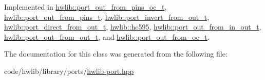 Implemented in \hyperlink{classhwlib_1_1port__out__from__pins__oc__t_ab146f9cb459f7a3b09bd2beae0948210}{hwlib\+::port\+\_\+out\+\_\+from\+\_\+pins\+\_\+oc\+\_\+t}, \hyperlink{classhwlib_1_1port__out__from__pins__t_a8d2a9ecce13e824b305a654675e572e5}{hwlib\+::port\+\_\+out\+\_\+from\+\_\+pins\+\_\+t}, \hyperlink{classhwlib_1_1port__invert__from__out__t_aaa8d6d9bb1d98cd3526d3eb6a91f34d9}{hwlib\+::port\+\_\+invert\+\_\+from\+\_\+out\+\_\+t}, \hyperlink{classhwlib_1_1port__direct__from__out__t_a1548ef3dcb6d110a5b58e3698325ca11}{hwlib\+::port\+\_\+direct\+\_\+from\+\_\+out\+\_\+t}, \hyperlink{classhwlib_1_1hc595_a5cc052f6de8be418a6a3cb69919fd168}{hwlib\+::hc595}, \hyperlink{classhwlib_1_1port__out__from__in__out__t_acc2b58e61226bcf46f7f4c30c94084ee}{hwlib\+::port\+\_\+out\+\_\+from\+\_\+in\+\_\+out\+\_\+t}, \hyperlink{classhwlib_1_1port__out__from__out__t_a42fc682057ea78b827900e95cb3e0d0c}{hwlib\+::port\+\_\+out\+\_\+from\+\_\+out\+\_\+t}, and \hyperlink{classhwlib_1_1port__out__from__oc__t_a33a024caac179b1d82b82d09bfca7645}{hwlib\+::port\+\_\+out\+\_\+from\+\_\+oc\+\_\+t}.



The documentation for this class was generated from the following file\+:\begin{DoxyCompactItemize}
\item 
code/hwlib/library/ports/\hyperlink{hwlib-port_8hpp}{hwlib-\/port.\+hpp}\end{DoxyCompactItemize}
